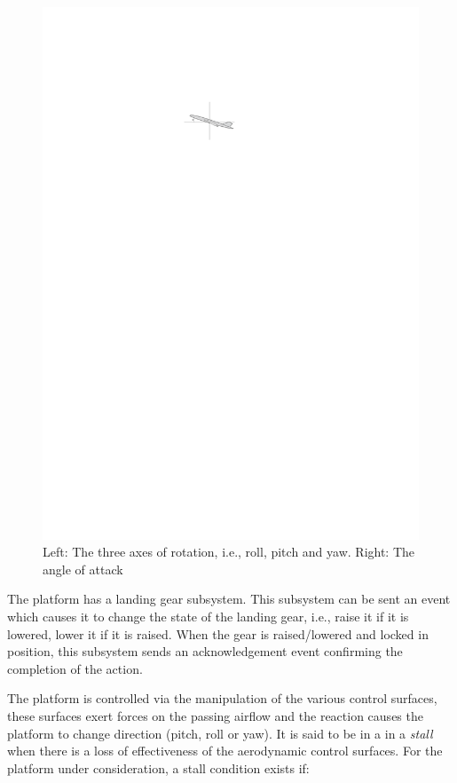 \begin{figure}
\includegraphics[scale=2]{figs/aoa}
\caption{Left: The three axes of rotation, i.e., roll, pitch and
  yaw. Right: The angle of attack}
\label{fig:aero}
\end{figure}

The platform has a landing gear subsystem. This subsystem can be sent
an event which causes it to change the state of the landing gear,
i.e., raise it if it is lowered, lower it if it is raised. When the
gear is raised/lowered and locked in position, this subsystem sends an
acknowledgement event confirming the completion of the action.

The platform is controlled via the manipulation of the various control
surfaces, these surfaces exert forces on the passing airflow and the
reaction causes the platform to change direction (pitch, roll or
yaw). It is said to be in a in a \emph{stall} when there is a loss of
effectiveness of the aerodynamic control surfaces. For the platform
under consideration, a stall condition exists if:

